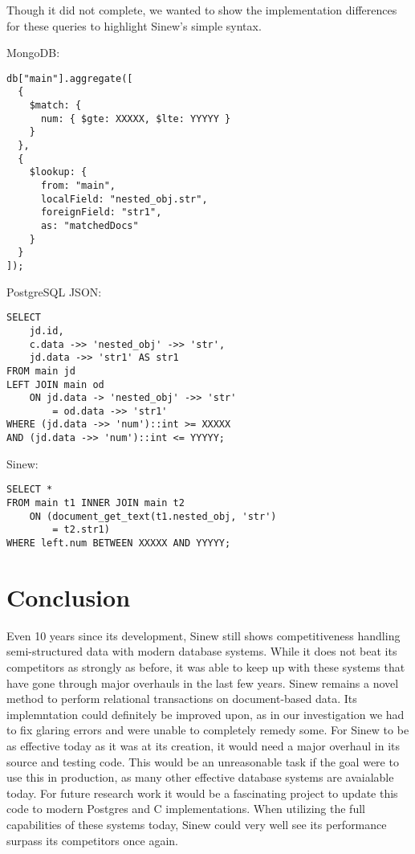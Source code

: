 \documentclass[sigconf]{acmart}
\begin{document}
Though it did not complete, we wanted to show the implementation differences for these queries to highlight Sinew's simple syntax.

\noindent
MongoDB:
\begin{tcolorbox}[colback=gray!10, colframe=gray!50, sharp corners, boxrule=0.1mm]
\begin{verbatim} 
db["main"].aggregate([
  {
    $match: {
      num: { $gte: XXXXX, $lte: YYYYY }
    }
  },
  {
    $lookup: {
      from: "main",
      localField: "nested_obj.str",
      foreignField: "str1",
      as: "matchedDocs"
    }
  }
]);
\end{verbatim}
\end{tcolorbox}

\noindent
PostgreSQL JSON:
\begin{tcolorbox}[colback=gray!10, colframe=gray!50, sharp corners, boxrule=0.1mm]
\begin{verbatim} 
SELECT 
    jd.id,
    c.data ->> 'nested_obj' ->> 'str',
    jd.data ->> 'str1' AS str1
FROM main jd
LEFT JOIN main od
    ON jd.data -> 'nested_obj' ->> 'str' 
        = od.data ->> 'str1'
WHERE (jd.data ->> 'num')::int >= XXXXX
AND (jd.data ->> 'num')::int <= YYYYY;
\end{verbatim}
\end{tcolorbox}

\noindent
Sinew:
\begin{tcolorbox}[colback=gray!10, colframe=gray!50, sharp corners, boxrule=0.1mm]
\begin{verbatim} 
SELECT *
FROM main t1 INNER JOIN main t2
    ON (document_get_text(t1.nested_obj, 'str') 
        = t2.str1)
WHERE left.num BETWEEN XXXXX AND YYYYY;  
\end{verbatim}
\end{tcolorbox}

\section{Conclusion}
Even 10 years since its development, Sinew still shows competitiveness handling semi-structured data with modern database systems. While it does not beat its competitors as strongly as before, it was able to keep up with these systems that have gone through major overhauls in the last few years. Sinew remains a novel method to perform relational transactions on document-based data. Its implemntation could definitely be improved upon, as in our investigation we had to fix glaring errors and were unable to completely remedy some. For Sinew to be as effective today as it was at its creation, it would need a major overhaul in its source and testing code. This would be an unreasonable task if the goal were to use this in production, as many other effective database systems are avaialable today. For future research work it would be a fascinating project to update this code to modern Postgres and C implementations. When utilizing the full capabilities of these systems today, Sinew could very well see its performance surpass its competitors once again.



\end{document}
